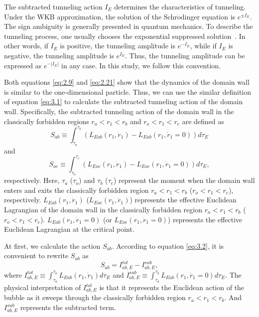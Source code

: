 \documentclass[12pt]{article}
\begin{document}
The subtracted tunneling action  $I_{E}$ determines the characteristics of tunneling. Under the WKB approximation, the solution of the Schr$\mathrm{\ddot{o}}$dinger equation is  $e^{\pm I_{E}}$. The sign ambiguity is generally presented in quantum mechanics. To describe the tunneling process, one usually chooses the exponential suppressed solution~\cite{EAJ}. In other words, if $I_{E}$ is positive, the tunneling amplitude is $e^{- I_{E}}$, while if $I_{E}$ is negative, the tunneling amplitude is $e^{I_{E}}$. Thus, the tunneling amplitude can be expressed as $e^{-|I_{E}|}$ in any case.  In this study, we follow this convention.

Both equations \eqref{eq:2.9} and \eqref{eq:2.21} show that the dynamics of the domain wall is similar to the one-dimensional particle. Thus, we can use the similar definition of equation \eqref{eq:3.1} to calculate the subtracted tunneling action of the domain wall. Specifically, the subtracted tunneling action of the domain wall in the classically forbidden regions $r_{a}<r_{1}<r_{b}$  and $r_{o}<r_{1}<r_{e}$ are defined as
\begin{equation}
\label{eq:3.2}%
S_{ab}\equiv \int_{\tau_{a}}^{\tau_{b}}(L_{Eab}(r_{1},\dot{r}_{1})-L_{Eab}(r_{1},\dot{r}_{1}=0))d\tau_{E}
\end{equation}
and
\begin{equation}
\label{eq:3.3}%
S_{oe}\equiv \int_{\tau_{o}}^{\tau_{e}}(L_{Eoe}(r_{1},\dot{r}_{1})-L_{Eoe}(r_{1},\dot{r}_{1}=0))d\tau_{E},
\end{equation}
respectively. Here, $\tau_{a}$ ($\tau_{o}$) and $\tau_{b}$ ($\tau_{e}$) represent the moment when the domain wall enters and exits the classically forbidden region $r_{a}<r_{1}<r_{b}$ ($r_{o}<r_{1}<r_{e}$), respectively. $L_{Eab}(r_{1},\dot{r}_{1})$ ($L_{Eoe}(r_{1},\dot{r}_{1})$) represents the effective Euclidean Lagrangian of the domain wall in the classically forbidden region $r_{a}<r_{1}<r_{b}$ ($r_{o}<r_{1}<r_{e}$). $L_{Eab}(r_{1},\dot{r}_{1}=0)$ (or $L_{Eoe}(r_{1},\dot{r}_{1}=0)$) represents the effective Euclidean Lagrangian at the critical point.

At first, we calculate the action $S_{ab}$. According to equation \eqref{eq:3.2}, it is convenient to rewrite $S_{ab}$ as
\begin{equation}
\label{eq:3.4}%
S_{ab}=I^{tot}_{ab,E}-I^{sub}_{ab,E},
\end{equation}
where $I^{tot}_{ab,E}\equiv \int_{\tau_{a}}^{\tau_{b}}L_{Eab}(r_{1},\dot{r}_{1})d\tau_{E}$ and $I^{sub}_{ab,E}\equiv\int_{\tau_{a}}^{\tau_{b}}L_{Eab}(r_{1},\dot{r}_{1}=0)d\tau_{E}$. The physical interpretation of $I^{tot}_{ab,E}$ is that it represents the Euclidean action of the bubble as it sweeps through the classically forbidden region $r_{a}<r_{1}<r_{b}$. And $I^{sub}_{ab,E}$ represents the subtracted term.
\end{document}
